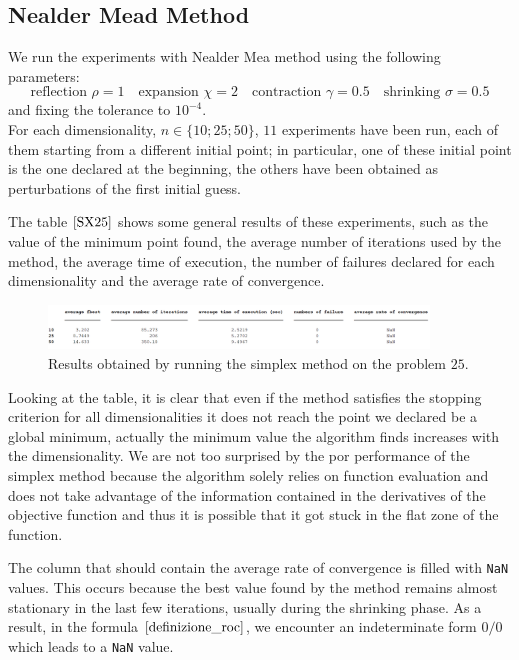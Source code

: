 \subsection*{Nealder Mead Method}
We run the experiments with Nealder Mea method using the following parameters:
\begin{equation*}
    \text{reflection } \rho = 1 \quad
    \text{expansion } \chi = 2 \quad
    \text{contraction } \gamma = 0.5 \quad
    \text{shrinking } \sigma = 0.5
\end{equation*}
and fixing the tolerance to $10^{-4}$.
\\ For each dimensionality, $n \in \{10; 25; 50\}$, $11$ experiments have been run, each of them starting from a different initial point; in particular, one of these initial point is the one declared at the beginning, the others have been obtained as perturbations of the first initial guess.

The table $\eqref{SX25}$ shows some general results of these experiments, such as the value of the minimum point found, the average number of iterations used by the method, the average time of execution, the number of failures declared for each dimensionality and the average rate of convergence.
\begin{figure}[htbp]
    \centering
    \includegraphics[width = 0.9\textwidth]{img/pb25_SX_table.png}
    \caption{Results obtained by running the simplex method on the problem $25$.}
    \label{SX25}
\end{figure}

Looking at the table, it is clear that even if the method satisfies the stopping criterion for all dimensionalities it does not reach the point we declared be a global minimum, actually the minimum value the algorithm finds increases with the dimensionality.
We are not too surprised by the por performance of the simplex method because the algorithm solely relies on function evaluation and does not take advantage of the information contained in the derivatives of the objective function and thus it is possible that it got stuck in the flat zone of the function.

The column that should contain the average rate of convergence is filled with \verb+NaN+ values. This occurs because the best value found by the method remains almost stationary in the last few iterations, usually during the shrinking phase. As a result, in the formula $\eqref{definizione_roc}$, we encounter an indeterminate form $0/0$ which leads to a \verb+NaN+ value.



